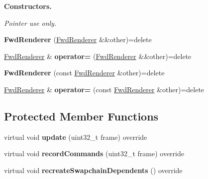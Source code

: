 \begin{Indent}\textbf{ Constructors.}\par
{\em Pointer use only. }\begin{DoxyCompactItemize}
\item 
\mbox{\label{classblaze_1_1FwdRenderer_a0792c9fa2393260dab48fad131ad03f0}} 
{\bfseries Fwd\+Renderer} (\hyperlink{classblaze_1_1FwdRenderer}{Fwd\+Renderer} \&\&other)=delete
\item 
\mbox{\label{classblaze_1_1FwdRenderer_a15645403475fad4ec8c03dd3005237f6}} 
\hyperlink{classblaze_1_1FwdRenderer}{Fwd\+Renderer} \& {\bfseries operator=} (\hyperlink{classblaze_1_1FwdRenderer}{Fwd\+Renderer} \&\&other)=delete
\item 
\mbox{\label{classblaze_1_1FwdRenderer_a0d31a6eca8dd011994b7a475230f352b}} 
{\bfseries Fwd\+Renderer} (const \hyperlink{classblaze_1_1FwdRenderer}{Fwd\+Renderer} \&other)=delete
\item 
\mbox{\label{classblaze_1_1FwdRenderer_acba62a051daf0002ad36325074e34bb1}} 
\hyperlink{classblaze_1_1FwdRenderer}{Fwd\+Renderer} \& {\bfseries operator=} (const \hyperlink{classblaze_1_1FwdRenderer}{Fwd\+Renderer} \&other)=delete
\end{DoxyCompactItemize}
\end{Indent}
\subsection*{Protected Member Functions}
\begin{DoxyCompactItemize}
\item 
\mbox{\label{classblaze_1_1FwdRenderer_ab402f10b76cc1f298b5c5df16a47ec4a}} 
virtual void {\bfseries update} (uint32\+\_\+t frame) override
\item 
\mbox{\label{classblaze_1_1FwdRenderer_ac9f37fa5189aa08c5ee22348b404ed16}} 
virtual void {\bfseries record\+Commands} (uint32\+\_\+t frame) override
\item 
\mbox{\label{classblaze_1_1FwdRenderer_a991222407e69acd35404a4e4de4a37f8}} 
virtual void {\bfseries recreate\+Swapchain\+Dependents} () override
\end{DoxyCompactItemize}
